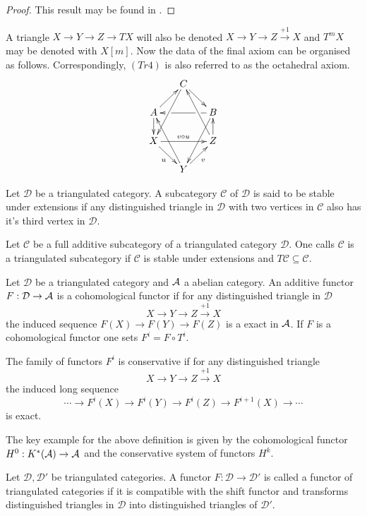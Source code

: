 \begin{proof}
  This result may be found in \cite[Chapter 1]{dimca2004sheaves}.
\end{proof}
A triangle $X\to Y \to Z \to TX$ will also be denoted $X\to Y \to Z \xrightarrow{+1} X$ and $T^m X$ may be denoted with $X[m]$.
Now the data of the final axiom can be organised as follows.
Correspondingly, $(Tr4)$ is also referred to as the octahedral axiom.
\begin{equation*}
\xymatrix@=1.6em{
& C \ar@{->}[dr] \ar[ddl] & \\
A \ar@{->}[ur] \ar[d]& &
   B\ar[ll]|(0.25)\hole|(0.75)\hole
      \ar[ddl] \\
X \ar[rr]^{v \circ u} \ar[dr]_u & &
   Z \ar[u] \ar[uul]\\
& Y \ar[ur]_v \ar[uul]&
}
\end{equation*}
\begin{definition}
 Let $\mathcal{D}$ be a triangulated category. A subcategory $\mathcal{C}$ of $\mathcal{D}$ is said to be stable under extensions if any distinguished triangle in $\mathcal{D}$ with two vertices in $\mathcal{C}$ also has it's third vertex in $\mathcal{D}$.
\end{definition}
\begin{definition}
 Let $\mathcal{C}$ be a full additive subcategory of a triangulated category $\mathcal{D}$. One calls $\mathcal{C}$ is a triangulated subcategory if $\mathcal{C}$ is stable under extensions and $T\mathcal{C}\subseteq \mathcal{C}$.
\end{definition}

\begin{definition}
 Let $\mathcal{D}$ be a triangulated category and $\AA$ a abelian category.
 An additive functor $F:\mathcal{D} \to \AA$ is a cohomological functor if for any distinguished triangle in $\mathcal{D}$
 $$X \to Y \to Z\xrightarrow{+1} X $$
 the induced sequence $F(X) \to F(Y) \to F(Z) $
 is a exact in $\AA$. If $F$ is a cohomological functor one sets $F^i = F\circ T^i$.

 The family of functors $F^i$ is conservative if for any distinguished triangle
 $$X \to Y \to Z \xrightarrow{+1} X$$
 the induced long sequence
 $$\cdots \to F^i(X) \to F^i(Y) \to F^i(Z) \to F^{i+1}(X) \to \cdots $$
 is exact.
\end{definition}
The key example for the above definition is given by the cohomological functor $H^0: K^*(\AA) \to \AA$ and the conservative system of functors $H^k$.
\begin{definition}
 Let $\mathcal{D}, \mathcal{D}'$ be triangulated categories.
 A functor $F:\mathcal{D} \to \mathcal{D}'$ is called a functor of triangulated categories if it is compatible with the shift functor and transforms distinguished triangles in $\mathcal{D}$ into distinguished triangles of $\mathcal{D}'$.
\end{definition}
